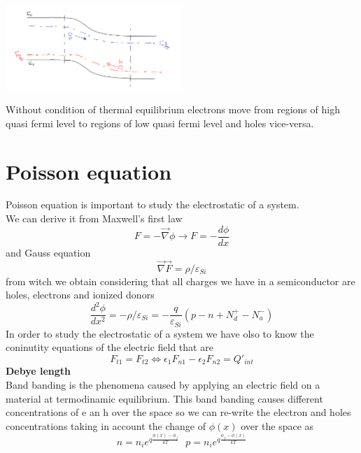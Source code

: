 \centering
\includegraphics[width=0.5\textwidth]{bandsgeo2.png}\\
\raggedright

Without condition of thermal equilibrium electrons move from regions of high quasi fermi level to regions of low quasi fermi level and holes vice-versa.
\section{Poisson equation}
Poisson equation is important to study the electrostatic of a system.\\
We can derive it from Maxwell's first law 
\begin{equation}
F=-\overrightarrow{\nabla}\phi\rightarrow F=-\frac{d\phi}{dx}
\end{equation}
and Gauss equation
\begin{equation}
\overrightarrow{\nabla}\overrightarrow{F}=\rho/\varepsilon_{Si}
\end{equation}
from witch we obtain considering that all charges we have in a semiconductor are holes, electrons and ionized donors 
\begin{equation}
\frac{d^2\phi}{dx^2}=-\rho/\varepsilon_{Si}=-\frac{q}{\varepsilon_{Si}}(p-n+N_d^+-N_a^-)
\end{equation}
In order to study the electrostatic of a system we have olso to know the coninutity equations of the electric field that are
\begin{equation}
F_{t1}=F_{t2} \Longleftrightarrow \epsilon_1F_{n1}-\epsilon_2F_{n2}=Q'_{int}
\end{equation}
\newline
{\bf Debye length}\\
Band banding is the phenomena caused by applying an electric field on a material at termodinamic equilibrium. This band banding causes different concentrations of e an h over the space so we can re-write the electron and holes concentrations taking in account the change of $\phi(x)$ over the space as
\begin{equation}
n=n_ie^{q\frac{\phi(x)-\phi_f}{kT}} \ \ \ p=n_ie^{q\frac{\phi_f-\phi(x)}{kT}}
\end{equation}
